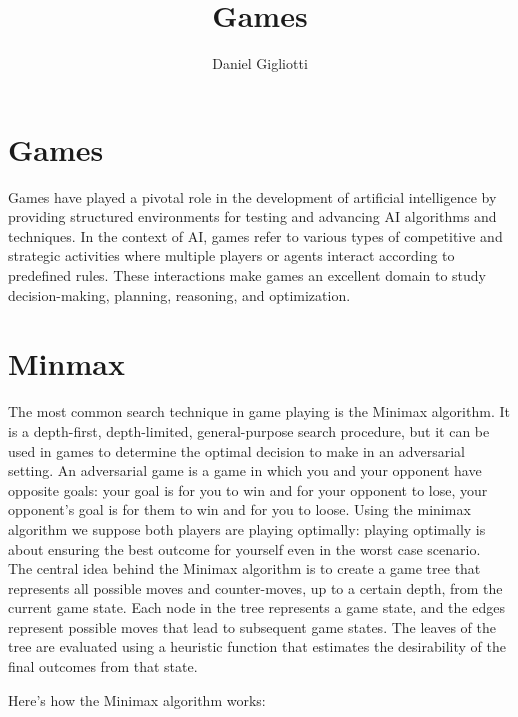 \documentclass{article}
\title{Games}
\author{Daniel Gigliotti}
\date{}
\begin{document}
\maketitle

\section{Games}

Games have played a pivotal role in the development of artificial intelligence by providing structured environments for testing and advancing AI algorithms and techniques. In the context of AI, games refer to various types of competitive and strategic activities where multiple players or agents interact according to predefined rules. These interactions make games an excellent domain to study decision-making, planning, reasoning, and optimization.

\section{Minmax}

The most common search technique in game playing is the Minimax algorithm. 
It is a depth-first, depth-limited, general-purpose search procedure, but it can be used in games to determine the optimal decision to make in an adversarial setting. An adversarial game is a game in which you and your opponent have opposite goals: your goal is for you to win and for your opponent to lose, your opponent's goal is for them to win and for you to loose. Using the minimax algorithm we suppose both players are playing optimally: playing optimally is about ensuring the best outcome for yourself even in the worst case scenario. \\

The central idea behind the Minimax algorithm is to create a game tree that represents all possible moves and counter-moves, up to a certain depth, from the current game state. Each node in the tree represents a game state, and the edges represent possible moves that lead to subsequent game states. The leaves of the tree are evaluated using a heuristic function that estimates the desirability of the final outcomes from that state.

\newpage

Here's how the Minimax algorithm works:
\end{document}
